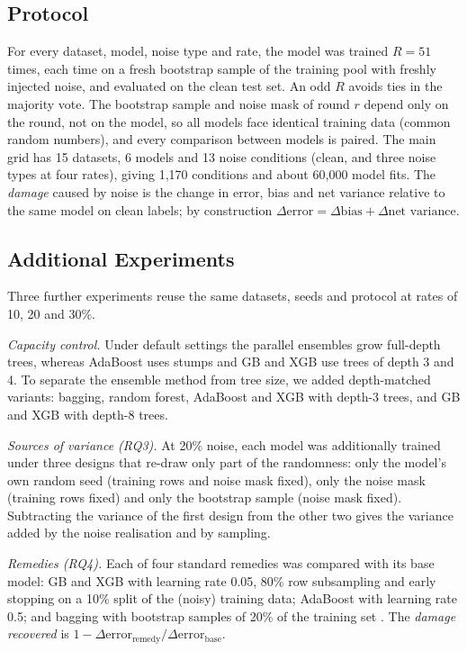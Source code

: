 \documentclass[conference,a4paper]{IEEEtran}
\begin{document}
\subsection{Protocol}
For every dataset, model, noise type and rate, the model was trained $R=51$ times, each time on a fresh bootstrap sample of the training pool with freshly injected noise, and evaluated on the clean test set. An odd $R$ avoids ties in the majority vote. The bootstrap sample and noise mask of round $r$ depend only on the round, not on the model, so all models face identical training data (common random numbers), and every comparison between models is paired. The main grid has 15 datasets, 6 models and 13 noise conditions (clean, and three noise types at four rates), giving 1{,}170 conditions and about 60{,}000 model fits. The \emph{damage} caused by noise is the change in error, bias and net variance relative to the same model on clean labels; by construction $\Delta\text{error}=\Delta\text{bias}+\Delta\text{net variance}$.

\subsection{Additional Experiments}
Three further experiments reuse the same datasets, seeds and protocol at rates of 10, 20 and 30\%.

\emph{Capacity control.} Under default settings the parallel ensembles grow full-depth trees, whereas AdaBoost uses stumps and GB and XGB use trees of depth 3 and 4. To separate the ensemble method from tree size, we added depth-matched variants: bagging, random forest, AdaBoost and XGB with depth-3 trees, and GB and XGB with depth-8 trees.

\emph{Sources of variance (RQ3).} At 20\% noise, each model was additionally trained under three designs that re-draw only part of the randomness: only the model's own random seed (training rows and noise mask fixed), only the noise mask (training rows fixed) and only the bootstrap sample (noise mask fixed). Subtracting the variance of the first design from the other two gives the variance added by the noise realisation and by sampling.

\emph{Remedies (RQ4).} Each of four standard remedies was compared with its base model: GB and XGB with learning rate 0.05, 80\% row subsampling and early stopping on a 10\% split of the (noisy) training data; AdaBoost with learning rate 0.5; and bagging with bootstrap samples of 20\% of the training set \cite{sabzevari2015}. The \emph{damage recovered} is $1-\Delta\text{error}_{\text{remedy}}/\Delta\text{error}_{\text{base}}$.
\end{document}
